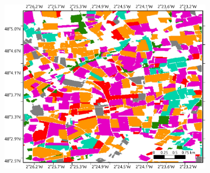 \documentclass[journal,article,submit,pdftex,moreauthors]{Definitions/mdpi}
\begin{document}
\begin{figure}[H]
\begin{subfigure}[t]{0.28\linewidth}
	\caption{}
	\label{fig:classification_pixel_level}
	\end{subfigure}%
	\begin{subfigure}[t]{0.28\linewidth}
    \includegraphics[height=\linewidth,width=\textwidth]{figures/aes_1_layer_mse_results/prediction_field_based_format_v2.pdf}
	  \caption{}
	  \label{fig:classification_map_field}
	\end{subfigure}
    \begin{subfigure}[t]{0.15\linewidth}

\end{subfigure}
\end{figure}
\end{document}
